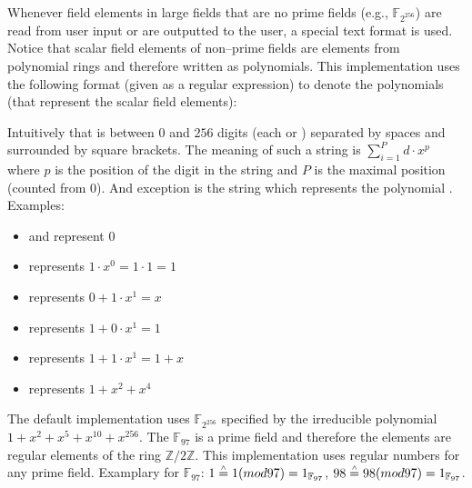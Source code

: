 




%
%
\label{sec:user-io}

Whenever field elements in large fields that are no prime fields (e.g.,
$\mathbb{F}_{2^{256}}$) are read from user input or are outputted to the user, a
special text format is used. Notice that scalar field elements of non--prime
fields are elements from polynomial rings and therefore written as polynomials.
This implementation uses the following format (given as a regular expression) to
denote the polynomials (that represent the scalar field elements):

\JWcode{\textbackslash[([01]( [01])\{0,255\})?\textbackslash]}

Intuitively that is between $0$ and $256$ digits (each  or )
separated by spaces and surrounded by square brackets. The meaning of such a
string is $\sum_{i=1}^P d \cdot x^p$ where $p$ is the position of the digit in
the string and $P$ is the maximal position (counted from $0$). And exception is
the string \JWcode{[]} which represents the polynomial .  Examples:

\begin{itemize}

  \item \JWcode{[]} and \JWcode{[0]} represent $0$

  \item \JWcode{[1]} represents $1 \cdot x^0 = 1 \cdot 1 = 1$

  \item \JWcode{[0 1]} represents $0 + 1 \cdot x^1 = x$

  \item \JWcode{[1 0]} represents $1 + 0 \cdot x^1 = 1$

  \item \JWcode{[1 1]} represents $1 + 1 \cdot x^1 = 1 + x$

  \item \JWcode{[1 0 1 0 1 0]} represents $1 + x^2 + x^4$

\end{itemize}

The default implementation uses $\mathbb{F}_{2^{256}}$ specified by the
irreducible polynomial $1 + x^2 + x^5 + x^{10} + x^{256}$. The $\mathbb{F}_{97}$
is a prime field and therefore the elements are regular elements of the ring
$\mathbb{Z}/2\mathbb{Z}$.  This implementation uses regular numbers for any
prime field. Examplary for $\mathbb{F}_{97}$: $1 \stackrel{\scriptscriptstyle\wedge}{=} 1 (mod 97) =
1_{\mathbb{F}_{97}}$, $98 \stackrel{\scriptscriptstyle\wedge}{=} 98 (mod 97) = 1_{\mathbb{F}_{97}}$.


